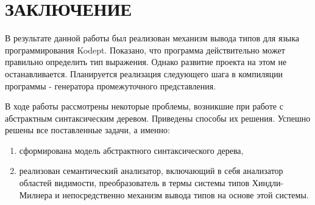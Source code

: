 \chapter*{ЗАКЛЮЧЕНИЕ}\label{chap_conclusion}

В результате данной работы был реализован механизм вывода типов для языка программирования Kodept.
Показано, что программа действительно может правильно определить тип выражения.
Однако развитие проекта на этом не останавливается.
Планируется реализация следующего шага в компиляции программы - генератора промежуточного представления.

В ходе работы рассмотрены некоторые проблемы, возникшие при работе с абстрактным синтаксическим деревом.
Приведены способы их решения.
Успешно решены все поставленные задачи, а именно:
\begin{enumerate}[1)]
    \item сформирована модель абстрактного синтаксического дерева,
    \item реализован семантический анализатор, включающий в себя анализатор областей видимости, преобразователь в термы системы типов Хиндли-Милнера и непосредственно механизм вывода типов на основе этой системы.
\end{enumerate}


